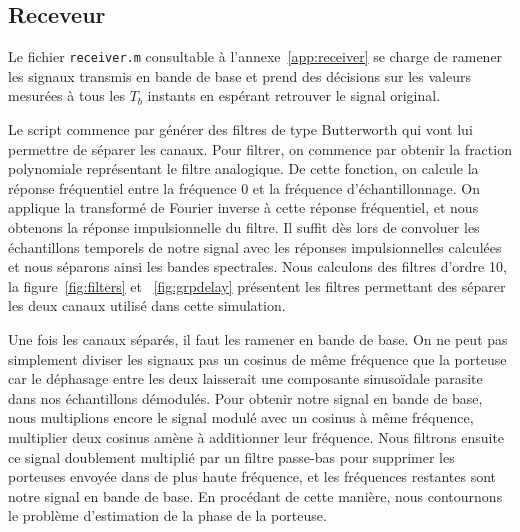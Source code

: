 \documentclass[10pt, oneside, a4paper]{article}
\begin{document}
\subsection{Receveur}
Le fichier \texttt{receiver.m} consultable à l'annexe~\ref{app:receiver} se charge de ramener les signaux transmis en bande de base et prend des décisions sur les valeurs mesurées à tous les $T_b$ instants en espérant retrouver le signal original.

Le script commence par générer des filtres de type Butterworth qui vont lui permettre de séparer les canaux.
Pour filtrer, on commence par obtenir la fraction polynomiale représentant le filtre analogique.
De cette fonction, on calcule la réponse fréquentiel entre la fréquence 0 et la fréquence d'échantillonnage.
On applique la transformé de Fourier inverse à cette réponse fréquentiel, et nous obtenons la réponse impulsionnelle du filtre.
Il suffit dès lors de convoluer les échantillons temporels de notre signal avec les réponses impulsionnelles calculées et nous séparons ainsi les bandes spectrales.
Nous calculons des filtres d'ordre 10, la figure~\ref{fig:filters} et ~\ref{fig:grpdelay} présentent les filtres permettant des séparer les deux canaux utilisé dans cette simulation.

Une fois les canaux séparés, il faut les ramener en bande de base.
On ne peut pas simplement diviser les signaux pas un cosinus de même fréquence que la porteuse car le déphasage entre les deux laisserait une composante sinusoïdale parasite dans nos échantillons démodulés.
Pour obtenir notre signal en bande de base, nous multiplions encore le signal modulé avec un cosinus à même fréquence, multiplier deux cosinus amène à additionner leur fréquence.
Nous filtrons ensuite ce signal doublement multiplié par un filtre passe-bas pour supprimer les porteuses envoyée dans de plus haute fréquence, et les fréquences restantes sont notre signal en bande de base.
En procédant de cette manière, nous contournons le problème d'estimation de la phase de la porteuse.
\end{document}
